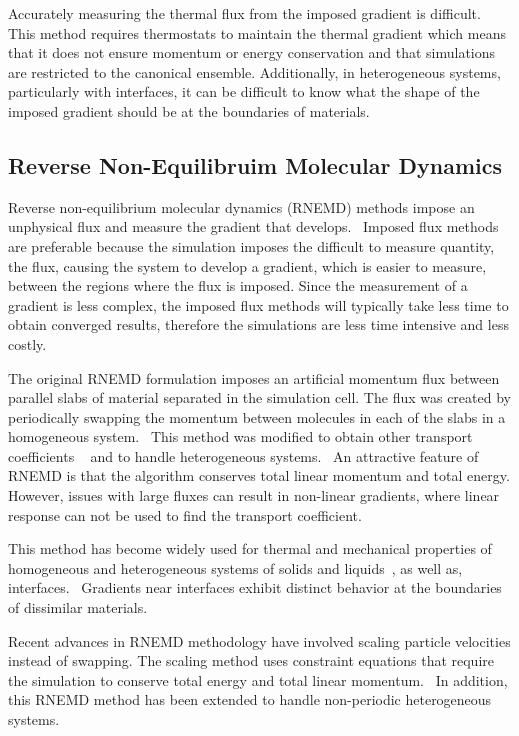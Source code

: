 Accurately measuring the thermal flux from the imposed gradient is difficult.
This method requires thermostats to maintain the thermal gradient which means that it does not ensure momentum or energy conservation and that simulations are restricted to the canonical ensemble.
Additionally, in heterogeneous systems, particularly with interfaces, it can be difficult to know what the shape of the imposed gradient should be at the boundaries of materials.

\subsection{Reverse Non-Equilibruim Molecular Dynamics}
Reverse non-equilibrium molecular dynamics (RNEMD) methods impose an unphysical flux and measure the gradient that develops.~\cite{Muller-Plathe:1997wq,Muller-Plathe:1999ao,Kuang:2012fe}
Imposed flux methods are preferable because the simulation imposes the difficult to measure quantity, the flux, causing the system to develop a gradient, which is easier to measure, between the regions where the flux is imposed. 
Since the measurement of a gradient is less complex, the imposed flux methods will typically take less time to obtain converged results, therefore the simulations are less time intensive and less costly.

The original RNEMD formulation imposes an artificial momentum flux between parallel slabs of material separated in the simulation cell. The flux was created by periodically swapping the momentum between molecules in each of the slabs in a homogeneous system.~\cite{Muller-Plathe:1997wq} 
This method was modified to obtain other transport coefficients ~\cite{Muller-Plathe:1999ao} and to handle heterogeneous systems.~\cite{Muller-plathe:2005} 
An attractive feature of RNEMD is that the algorithm conserves total linear momentum and total energy.
However, issues with large fluxes can result in non-linear gradients, where linear response can not be used to find the transport coefficient.~\cite{Tenney:2010rp}

This method has become widely used for thermal and mechanical properties of homogeneous and heterogeneous systems of solids and liquids~\cite{Muller-Plathe:1997wq,Muller-Plathe:1999ao, Tenney:2010rp}, as well as, interfaces.~\cite{Patel:2005zm, Shenogina:2009ix,Kuang:2011ef, Stocker:2013cl}
Gradients near interfaces exhibit distinct behavior at the boundaries of dissimilar materials.

Recent advances in RNEMD methodology have involved scaling particle velocities instead of swapping. The scaling method uses constraint equations that require the simulation to conserve total energy and total linear momentum.~\cite{Kuang:2011ef, Kuang:2012fe}
In addition, this RNEMD method has been extended to handle non-periodic heterogeneous systems.~\cite{Stocker:2014qq}

